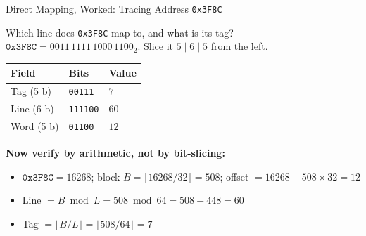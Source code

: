 \documentclass[aspectratio=169]{beamer}
\begin{document}
\begin{frame}{Direct Mapping, Worked: Tracing Address \texttt{0x3F8C}}
  \footnotesize
  \begin{exampleblock}{Which line does \texttt{0x3F8C} map to, and what is its tag?}
    $\texttt{0x3F8C} = 0011\,1111\,1000\,1100_2$. Slice it $5 \mid 6 \mid 5$
    from the left.
  \end{exampleblock}
  \vspace{-0.1cm}
  \begin{center}
  \begin{tabular}{@{}lll@{}}
    \toprule
    \textbf{Field} & \textbf{Bits} & \textbf{Value} \\
    \midrule
    Tag (5 b)  & \texttt{00111}  & $7$  \\
    Line (6 b) & \texttt{111100} & $60$ \\
    Word (5 b) & \texttt{01100}  & $12$ \\
    \bottomrule
  \end{tabular}
  \end{center}
  \vspace{0.15cm}
  \textbf{Now verify by arithmetic, not by bit-slicing:}
  \begin{itemize}
    \item $\texttt{0x3F8C} = 16268$; block $B = \lfloor 16268/32 \rfloor
      = 508$; offset $= 16268 - 508 \times 32 = 12$ \good{\checkmark}
    \item Line $= B \bmod L = 508 \bmod 64 = 508 - 448 = 60$
      \good{\checkmark}
    \item Tag $= \lfloor B/L \rfloor = \lfloor 508/64 \rfloor = 7$
      \good{\checkmark}
  \end{itemize}
\end{frame}
\end{document}
